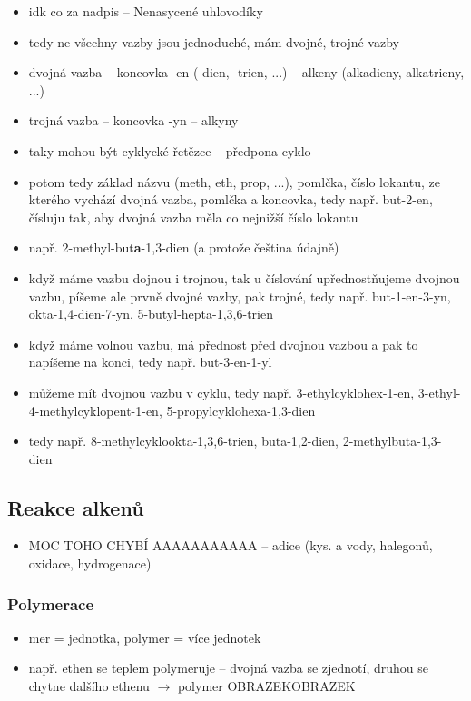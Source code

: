 \documentclass{article}
\begin{document}
\begin{itemize}
  \item idk co za nadpis -- Nenasycené uhlovodíky
  \item tedy ne všechny vazby jsou jednoduché, mám dvojné, trojné vazby
  \item dvojná vazba -- koncovka -en (-dien, -trien, ...) -- alkeny (alkadieny, alkatrieny, ...)
  \item trojná vazba -- koncovka -yn -- alkyny
  \item taky mohou být cyklycké řetězce -- předpona cyklo-
  \item potom tedy základ názvu (meth, eth, prop, ...), pomlčka, číslo lokantu, ze kterého vychází dvojná vazba, pomlčka a koncovka, tedy např. but-2-en, čísluju tak, aby dvojná vazba měla co nejnižší číslo lokantu
  \item např. 2-methyl-but\textbf{a}-1,3-dien (a protože čeština údajně)
  \item když máme vazbu dojnou i trojnou, tak u číslování upřednostňujeme dvojnou vazbu, píšeme ale prvně dvojné vazby, pak trojné, tedy např. but-1-en-3-yn, okta-1,4-dien-7-yn, 5-butyl-hepta-1,3,6-trien
  \item když máme volnou vazbu, má přednost před dvojnou vazbou a pak to napíšeme na konci, tedy např. but-3-en-1-yl
  \item můžeme mít dvojnou vazbu v cyklu, tedy např. 3-ethylcyklohex-1-en, 3-ethyl-4-methylcyklopent-1-en, 5-propylcyklohexa-1,3-dien
  \item tedy např. 8-methylcyklookta-1,3,6-trien, buta-1,2-dien, 2-methylbuta-1,3-dien
\end{itemize}

\subsection{Reakce alkenů}
\begin{itemize}
  \item MOC TOHO CHYBÍ AAAAAAAAAAA -- adice (kys. a vody, halegonů, oxidace, hydrogenace)
\end{itemize}

\subsubsection{Polymerace}
\begin{itemize}
  \item mer = jednotka, polymer = více jednotek
  \item např. ethen se teplem polymeruje -- dvojná vazba se zjednotí, druhou se chytne dalšího ethenu $\rightarrow$ polymer OBRAZEKOBRAZEK
\end{itemize}
\end{document}

